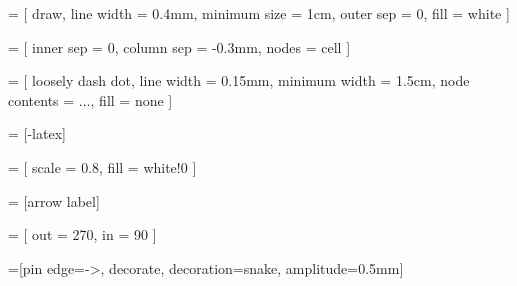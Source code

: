 \newcommand{\true}{\textcolor{green}{\ding{51}}}
\newcommand{\false}{\textcolor{red}{\ding{55}}}

 = [
  draw,
  line width = 0.4mm,
  minimum size = 1cm,
  outer sep = 0,
  fill = white
]

 = [
  inner sep = 0,
  column sep = -0.3mm,
  nodes = cell
]

 = [
  loosely dash dot,
  line width = 0.15mm,
  minimum width = 1.5cm,
  node contents = $\ldots$,
  fill = none
]

\newcommand{\ellipsis}{ \node [ellipsis]; }

 = [-latex]

 = [
  scale = 0.8,
  fill = white!0
]

 = [arrow label]

 = [
  out = 270,
  in = 90
]

=[pin edge={->, decorate, decoration={snake, amplitude=0.5mm}}]
